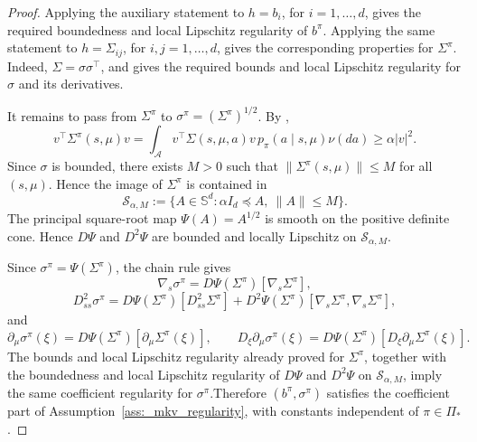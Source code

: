 \documentclass[a4paper, 10pt, english, reqno]{amsart}
\begin{document}
\begin{proof}
Applying the auxiliary statement to $h=b_i$, for $i=1,\dots,d$, gives
the required boundedness and local Lipschitz regularity of $b^\pi$.
Applying the same statement to $h=\Sigma_{ij}$, for
$i,j=1,\dots,d$, gives the corresponding properties for $\Sigma^\pi$.
Indeed, $\Sigma=\sigma\sigma^\top$, and 
gives the required bounds and local Lipschitz regularity for $\sigma$
and its derivatives.

It remains to pass from $\Sigma^\pi$ to
$\sigma^\pi=(\Sigma^\pi)^{1/2}$. By ,
\[
v^\top\Sigma^\pi(s,\mu)v
=
\int_{\mathcal A}
v^\top\Sigma(s,\mu,a)v\,p_\pi(a\mid s,\mu)\nu(da)
\ge \alpha |v|^2.
\]
Since $\sigma$ is bounded, there exists $M>0$ such that
$\|\Sigma^\pi(s,\mu)\|\le M$ for all $(s,\mu)$. Hence the image of
$\Sigma^\pi$ is contained in
\[
\mathcal S_{\alpha,M}
:=
\{A\in\mathbb S^d:\alpha I_d\preceq A,\ \|A\|\le M\}.
\]
The principal square-root map $\Psi(A)=A^{1/2}$ is smooth on the positive
definite cone. Hence $D\Psi$ and $D^2\Psi$ are bounded and locally
Lipschitz on $\mathcal S_{\alpha,M}$.

Since $\sigma^\pi=\Psi(\Sigma^\pi)$, the chain rule gives
\[
\nabla_s\sigma^\pi
=
D\Psi(\Sigma^\pi)[\nabla_s\Sigma^\pi],
\]
\[
D_{ss}^2\sigma^\pi
=
D\Psi(\Sigma^\pi)[D_{ss}^2\Sigma^\pi]
+
D^2\Psi(\Sigma^\pi)[\nabla_s\Sigma^\pi,\nabla_s\Sigma^\pi],
\]
and
\[
\partial_\mu\sigma^\pi(\xi)
=
D\Psi(\Sigma^\pi)[\partial_\mu\Sigma^\pi(\xi)],
\qquad
D_\xi\partial_\mu\sigma^\pi(\xi)
=
D\Psi(\Sigma^\pi)[D_\xi\partial_\mu\Sigma^\pi(\xi)].
\]
The bounds and local Lipschitz regularity already proved for
$\Sigma^\pi$, together with the boundedness and local Lipschitz
regularity of $D\Psi$ and $D^2\Psi$ on $\mathcal S_{\alpha,M}$, imply
the same coefficient regularity for $\sigma^\pi$.Therefore $(b^\pi,\sigma^\pi)$ satisfies the coefficient part of Assumption~\ref{ass:_mkv_regularity}, with constants independent of $\pi\in\Pi_*$.
\end{proof}
\end{document}
